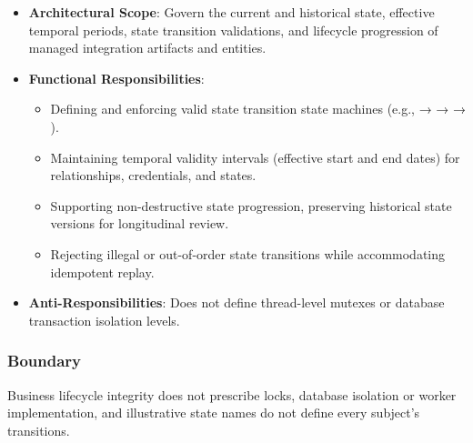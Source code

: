 \begin{itemize}

\item
\textbf{Architectural Scope}: Govern the current and historical state, effective temporal periods, state transition validations, and lifecycle progression of managed integration artifacts and entities.



\item
\textbf{Functional Responsibilities}:


\begin{itemize}

\item
Defining and enforcing valid state transition state machines (e.g., \texttt{} → \texttt{} → \texttt{} → \texttt{}).



\item
Maintaining temporal validity intervals (effective start and end dates) for relationships, credentials, and states.



\item
Supporting non-destructive state progression, preserving historical state versions for longitudinal review.



\item
Rejecting illegal or out-of-order state transitions while accommodating idempotent replay.



\end{itemize}


\item
\textbf{Anti-Responsibilities}: Does not define thread-level mutexes or database transaction isolation levels.



\end{itemize}
\subsubsection*{Boundary}

Business lifecycle integrity does not prescribe locks, database isolation or worker implementation, and illustrative state names do not define every subject's transitions.


